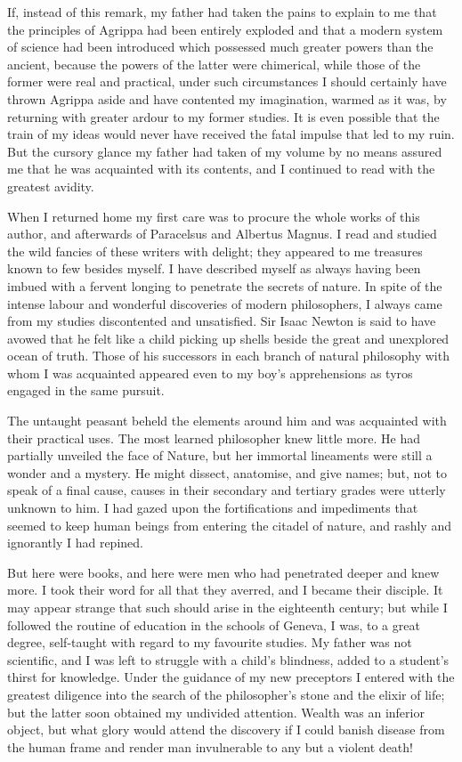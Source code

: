 \documentclass[12pt,openright]{book}
\begin{document}
If, instead of this remark, my father had taken the pains to explain to me that the principles of Agrippa had been entirely exploded and that a modern system of science had been introduced which possessed much greater powers than the ancient, because the powers of the latter were chimerical, while those of the former were real and practical, under such circumstances I should certainly have thrown Agrippa aside and have contented my imagination, warmed as it was, by returning with greater ardour to my former studies. It is even possible that the train of my ideas would never have received the fatal impulse that led to my ruin. But the cursory glance my father had taken of my volume by no means assured me that he was acquainted with its contents, and I continued to read with the greatest avidity.

When I returned home my first care was to procure the whole works of this author, and afterwards of Paracelsus and Albertus Magnus. I read and studied the wild fancies of these writers with delight; they appeared to me treasures known to few besides myself. I have described myself as always having been imbued with a fervent longing to penetrate the secrets of nature. In spite of the intense labour and wonderful discoveries of modern philosophers, I always came from my studies discontented and unsatisfied. Sir Isaac Newton is said to have avowed that he felt like a child picking up shells beside the great and unexplored ocean of truth. Those of his successors in each branch of natural philosophy with whom I was acquainted appeared even to my boy’s apprehensions as tyros engaged in the same pursuit.

The untaught peasant beheld the elements around him and was acquainted with their practical uses. The most learned philosopher knew little more. He had partially unveiled the face of Nature, but her immortal lineaments were still a wonder and a mystery. He might dissect, anatomise, and give names; but, not to speak of a final cause, causes in their secondary and tertiary grades were utterly unknown to him. I had gazed upon the fortifications and impediments that seemed to keep human beings from entering the citadel of nature, and rashly and ignorantly I had repined.

But here were books, and here were men who had penetrated deeper and knew more. I took their word for all that they averred, and I became their disciple. It may appear strange that such should arise in the eighteenth century; but while I followed the routine of education in the schools of Geneva, I was, to a great degree, self-taught with regard to my favourite studies. My father was not scientific, and I was left to struggle with a child’s blindness, added to a student’s thirst for knowledge. Under the guidance of my new preceptors I entered with the greatest diligence into the search of the philosopher’s stone and the elixir of life; but the latter soon obtained my undivided attention. Wealth was an inferior object, but what glory would attend the discovery if I could banish disease from the human frame and render man invulnerable to any but a violent death!
\end{document}
